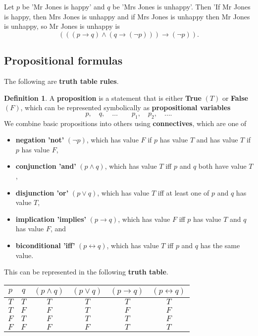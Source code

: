 \documentclass{article}
\newcommand{\rb}[1]{\left( #1 \right)}
\newcommand{\notb}[1]{\rb{\neg #1}}
\newcommand{\andb}[2]{\rb{#1 \land #2}}
\newcommand{\impb}[2]{\rb{#1 \rightarrow #2}}
\theoremstyle{definition}\newtheorem{definition}{Definition}[subsection]
\theoremstyle{definition}\newtheorem{remark}[definition]{Remark}
\theoremstyle{definition}\newtheorem*{example}{Example}
\theoremstyle{definition}\newtheorem*{note}{Note}
\begin{document}
Let $ p $ be 'Mr Jones is happy' and $ q $ be 'Mrs Jones is unhappy'. Then 'If Mr Jones is happy, then Mrs Jones is unhappy and if Mrs Jones is unhappy then Mr Jones is unhappy, so Mr Jones is unhappy is
$$ \impb{\andb{\impb{p}{q}}{\impb{q}{\notb{p}}}}{\notb{p}}. $$

\subsection{Propositional formulas}

The following are \textbf{truth table rules}.

\begin{definition}
\label{def:1.1.1}
A \textbf{proposition} is a statement that is either \textbf{True} $ \rb{T} $ or \textbf{False} $ \rb{F} $, which can be represented symbolically as \textbf{propositional variables}
$$ p, \quad q, \quad \dots \qquad p_1, \quad p_2, \quad \dots. $$
We combine basic propositions into others using \textbf{connectives}, which are one of
\begin{itemize}
\item \textbf{negation 'not'} $ \rb{\neg p} $, which has value $ F $ if $ p $ has value $ T $ and has value $ T $ if $ p $ has value $ F $,
\item \textbf{conjunction 'and'} $ \rb{p \land q} $, which has value $ T $ iff $ p $ and $ q $ both have value $ T $,
\item \textbf{disjunction 'or'} $ \rb{p \lor q} $, which has value $ T $ iff at least one of $ p $ and $ q $ has value $ T $,
\item \textbf{implication 'implies'} $ \rb{p \rightarrow q} $, which has value $ F $ iff $ p $ has value $ T $ and $ q $ has value $ F $, and
\item \textbf{biconditional 'iff'} $ \rb{p \leftrightarrow q} $, which has value $ T $ iff $ p $ and $ q $ has the same value.
\end{itemize}
This can be represented in the following \textbf{truth table}.
\begin{center}
\begin{tabular}{|c|c|c|c|c|c|}
\hline
$ p $ & $ q $ & $ \rb{p \land q} $ & $ \rb{p \lor q} $ & $ \rb{p \rightarrow q} $ & $ \rb{p \leftrightarrow q} $ \\
\hline
$ T $ & $ T $ & $ T $ & $ T $ & $ T $ & $ T $ \\
\hline
$ T $ & $ F $ & $ F $ & $ T $ & $ F $ & $ F $ \\
\hline
$ F $ & $ T $ & $ F $ & $ T $ & $ T $ & $ F $ \\
\hline
$ F $ & $ F $ & $ F $ & $ F $ & $ T $ & $ T $ \\
\hline
\end{tabular}
\end{center}
\end{definition}
\end{document}
